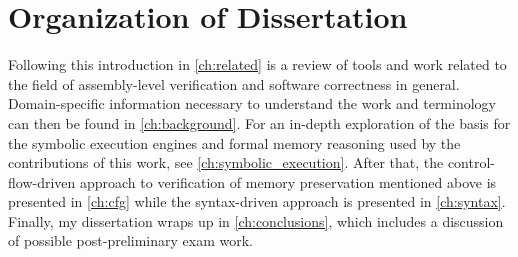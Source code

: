 \section{Organization of Dissertation}
Following this introduction in \cref{ch:related} is a review of tools and work
related to the field of assembly-level verification and software correctness in general.
Domain-specific information necessary to understand the work
and terminology can then be found in \cref{ch:background}.
For an in-depth exploration of the basis for the symbolic execution engines
and formal memory reasoning used by the contributions of this work,
see \cref{ch:symbolic_execution}.
After that, the control-flow-driven approach to verification of memory preservation
mentioned above is presented in \cref{ch:cfg}
while the syntax-driven approach is presented in \cref{ch:syntax}.
Finally, my dissertation wraps up in \cref{ch:conclusions},
which includes a discussion of possible post-preliminary exam work.
